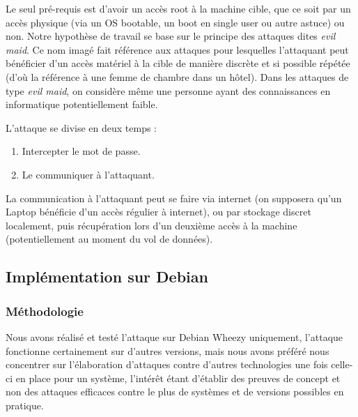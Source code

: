\documentclass[12pt,a4paper]{article}
\begin{document}
Le seul pré-requis est d'avoir un accès root à la machine cible, que ce soit
par un accès physique (via un OS bootable, un boot en single user ou autre
astuce) ou non. Notre hypothèse de travail se base sur le principe des attaques
dites \textit{evil maid}. Ce nom imagé fait référence aux attaques pour
lesquelles l'attaquant peut bénéficier d'un accès matériel à la cible de
manière discrète et si possible répétée (d'où la référence à une femme de
chambre dans un hôtel). Dans les attaques de type \textit{evil maid}, on
considère même une personne ayant des connaissances en informatique
potentiellement faible.

L'attaque se divise en deux temps :
\begin{enumerate}
    \item Intercepter le mot de passe.
    \item Le communiquer à l'attaquant.
\end{enumerate}

La communication à l'attaquant peut se faire via internet (on supposera qu'un
Laptop bénéficie d'un accès régulier à internet), ou par stockage discret
localement, puis récupération lors d'un deuxième accès à la machine
(potentiellement au moment du vol de données).

\subsection{Implémentation sur Debian}
\subsubsection*{Méthodologie}

Nous avons réalisé et testé l'attaque sur Debian Wheezy uniquement, l'attaque
fonctionne certainement sur d'autres versions, mais nous avons préféré nous
concentrer sur l'élaboration d'attaques contre d'autres technologies une fois
celle-ci en place pour un système, l'intérêt étant d'établir des preuves de 
concept et non des attaques efficaces contre le plus de systèmes et de versions
possibles en pratique.
\end{document}
